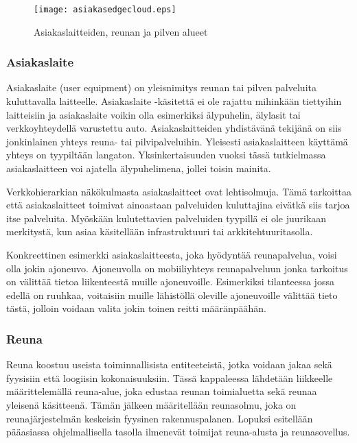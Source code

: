 \begin{figure}[tb]
\texttt{[image: asiakasedgecloud.eps]}
\caption{Asiakaslaitteiden, reunan ja pilven alueet} \label{fig:asiakasedgecloud}
\end{figure}

\subsubsection{Asiakaslaite}
Asiakaslaite (user equipment) on yleisnimitys reunan tai pilven palveluita kuluttavalla laitteelle.
Asiakaslaite -käsitettä ei ole rajattu mihinkään tiettyihin laitteisiin ja asiakaslaite voikin olla esimerkiksi älypuhelin, älylasit tai verkkoyhteydellä varustettu auto. 
Asiakaslaitteiden yhdistävänä tekijänä on siis jonkinlainen yhteys reuna- tai pilvipalveluihin. Yleisesti asiakaslaitteen käyttämä yhteys on tyypiltään langaton. 
Yksinkertaisuuden vuoksi tässä tutkielmassa asiakaslaitteen voi ajatella älypuhelimena, jollei toisin mainita.

Verkkohierarkian näkökulmasta asiakaslaitteet ovat lehtisolmuja. Tämä tarkoittaa että asiakaslaitteet toimivat ainoastaan palveluiden kuluttajina eivätkä siis tarjoa itse palveluita. Myöskään kulutettavien palveluiden tyypillä ei ole juurikaan merkitystä, kun asiaa käsitellään infrastruktuuri tai arkkitehtuuritasolla.

Konkreettinen esimerkki asiakaslaitteesta, joka hyödyntää reunapalvelua, voisi olla jokin ajoneuvo.
Ajoneuvolla on mobiiliyhteys reunapalveluun jonka tarkoitus on välittää tietoa liikenteestä muille ajoneuvoille. Esimerkiksi tilanteessa jossa edellä on ruuhkaa, voitaisiin muille lähistöllä oleville ajoneuvoille välittää tieto tästä, jolloin voidaan valita jokin toinen reitti määränpäähän.



\subsubsection{Reuna} \label{reunatoimijat}
Reuna koostuu useista toiminnallisista entiteeteistä, jotka voidaan jakaa sekä fyysisiin että loogiisin kokonaisuuksiin. 
Tässä kappaleessa lähdetään liikkeelle määrittelemällä reuna-alue, joka edustaa reunan toimialuetta sekä reunaa yleisenä käsitteenä.
Tämän jälkeen määritellään reunasolmu, joka on reunajärjestelmän keskeisin fyysinen rakennuspalanen.
Lopuksi esitellään pääasiassa ohjelmallisella tasolla ilmenevät toimijat reuna-alusta ja reunasovellus.


